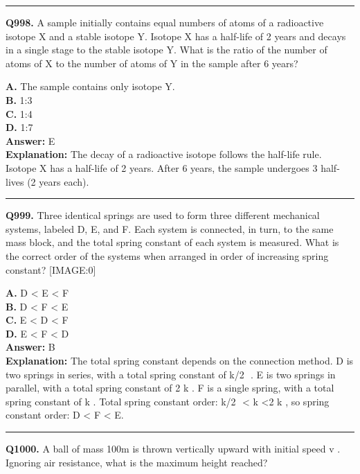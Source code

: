 \documentclass[12pt]{article}
\begin{document}
\hrule
\vspace{1em}


\noindent
\textbf{Q998.} A sample initially contains equal numbers of atoms of a radioactive isotope X and a stable isotope Y. Isotope X has a half-life of 2 years and decays in a single stage to the stable isotope Y. What is the ratio of the number of atoms of X to the number of atoms of Y in the sample after 6 years?



\textbf{A.} The sample contains only isotope Y. \\
\textbf{B.} 1:3 \\
\textbf{C.} 1:4 \\
\textbf{D.} 1:7 \\

\textbf{Answer:} E \\
\textbf{Explanation:} The decay of a radioactive isotope follows the half-life rule. Isotope X has a half-life of 2 years. After 6 years, the sample undergoes 3 half-lives (2 years each).

\hrule
\vspace{1em}


\noindent
\textbf{Q999.} Three identical springs are used to form three different mechanical systems, labeled D, E, and F. Each system is connected, in turn, to the same mass block, and the total spring constant of each system is measured. What is the correct order of the systems when arranged in order of increasing spring constant?
[IMAGE:0]



\textbf{A.} D < E < F \\
\textbf{B.} D < F < E \\
\textbf{C.} E < D < F \\
\textbf{D.} E < F < D \\

\textbf{Answer:} B \\
\textbf{Explanation:} The total spring constant depends on the connection method.
D is two springs in series, with a total spring constant of
k/2
​
.
E is two springs in parallel, with a total spring constant of 2
k
.
F is a single spring, with a total spring constant of
k
.
Total spring constant order:
k/2
​
<
k
<2
k
, so spring constant order: D < F < E.

\hrule
\vspace{1em}


\noindent
\textbf{Q1000.} A ball of mass
100m
is thrown vertically upward with initial speed
v
. Ignoring air resistance, what is the maximum height reached?
\end{document}
